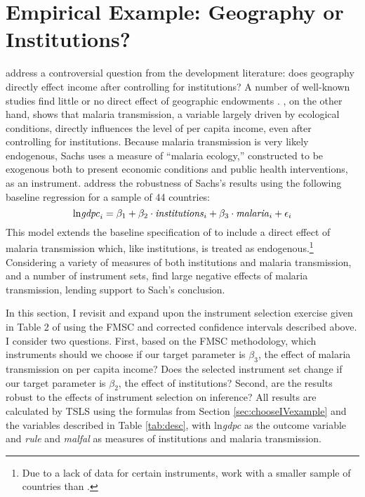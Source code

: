 \section{Empirical Example: Geography or Institutions?}
\label{sec:application}
\cite{Carstensen2006} address a controversial question from the development literature: does geography directly effect income after controlling for institutions? 
A number of well-known studies find little or no direct effect of geographic endowments \citep{Acemoglu,Rodrik,Easterly}. \cite{Sachs}, on the other hand, shows that malaria transmission, a variable largely driven by ecological conditions, directly influences the level of per capita income, even after controlling for institutions. Because malaria transmission is very likely endogenous, Sachs uses a measure of ``malaria ecology,'' constructed to be exogenous both to present economic conditions and public health interventions, as an instrument. 
\cite{Carstensen2006} address the robustness of Sachs's results using the following baseline regression for a sample of 44 countries:
\begin{equation}
	\mbox{ln\emph{gdpc}}_i = \beta_1 + \beta_2 \cdot \mbox{\emph{institutions}}_i + \beta_3 \cdot \mbox{\emph{malaria}}_i + \epsilon_i
\end{equation}
This model extends the baseline specification of \cite{Acemoglu} to include a direct effect of malaria transmission which, like institutions, is treated as endogenous.\footnote{Due to a lack of data for certain instruments, \cite{Carstensen2006} work with a smaller sample of countries than \cite{Acemoglu}.} 
Considering a variety of measures of both institutions and malaria transmission, and a number of instrument sets, \cite{Carstensen2006} find large negative effects of malaria transmission, lending support to Sach's conclusion.

In this section, I revisit and expand upon the instrument selection exercise given in Table 2 of \cite{Carstensen2006} using the FMSC and corrected confidence intervals described above. I consider two questions. 
First, based on the FMSC methodology, which instruments should we choose if our target parameter is $\beta_3$, the effect of malaria transmission on per capita income?
Does the selected instrument set change if our target parameter is $\beta_2$, the effect of institutions?
Second, are the results robust to the effects of instrument selection on inference?
All results are calculated by TSLS using the formulas from Section \ref{sec:chooseIVexample} and the variables described in Table \ref{tab:desc}, with ln\emph{gdpc} as the outcome  variable and \emph{rule} and \emph{malfal} as measures of institutions and malaria transmission.


